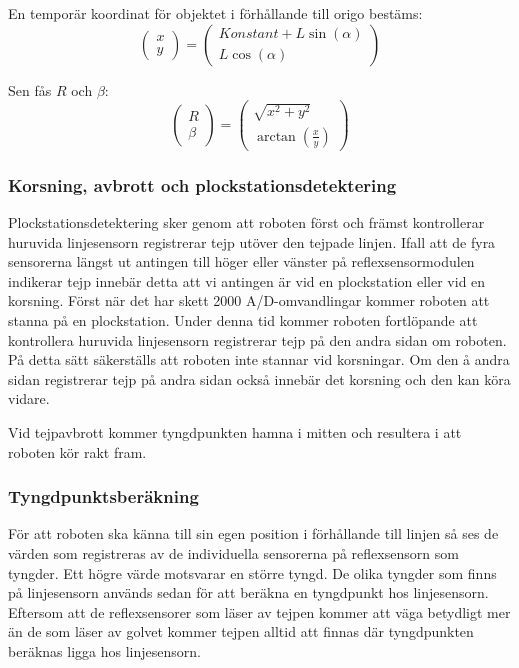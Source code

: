 En temporär koordinat för objektet i förhållande till origo bestäms:
$$\begin{pmatrix}
x \\ y
\end{pmatrix}
 = 
\begin{pmatrix}
Konstant+L \sin(\alpha) \\ 
L \cos(\alpha)
\end{pmatrix}$$

Sen fås $R$ och $\beta$:
$$\begin{pmatrix}
R \\ \beta
\end{pmatrix}
 = 
\begin{pmatrix}
\sqrt{x^2 + y^2} \\ 
\arctan(\frac{x}{y})
\end{pmatrix}$$

\subsubsection{Korsning, avbrott och plockstationsdetektering}

Plockstationsdetektering sker genom att roboten först och främst kontrollerar huruvida linjesensorn registrerar tejp utöver den tejpade linjen. Ifall att de fyra sensorerna längst ut antingen till höger eller vänster på reflexsensormodulen indikerar tejp innebär detta att vi antingen är vid en plockstation eller vid en korsning. Först när det har skett 2000 A/D-omvandlingar kommer roboten att stanna på en plockstation. Under denna tid kommer roboten fortlöpande att kontrollera huruvida linjesensorn registrerar tejp på den andra sidan om roboten. På detta sätt säkerställs att roboten inte stannar vid korsningar. Om den å andra sidan registrerar tejp på andra sidan också innebär det korsning och den kan köra vidare. 

Vid tejpavbrott kommer tyngdpunkten hamna i mitten och resultera i att roboten kör rakt fram.
 


\subsubsection{Tyngdpunktsberäkning}
För att roboten ska känna till sin egen position i förhållande till linjen så ses de värden som registreras av de individuella sensorerna på reflexsensorn som tyngder. Ett högre värde motsvarar en större tyngd. De olika tyngder som finns på linjesensorn används sedan för att beräkna en tyngdpunkt hos linjesensorn. Eftersom att de reflexsensorer som läser av tejpen kommer att väga betydligt mer än de som läser av golvet kommer tejpen alltid att finnas där tyngdpunkten beräknas ligga hos linjesensorn.

